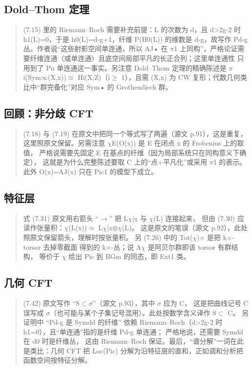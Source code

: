 \subsection*{Dold--Thom 定理}
\begin{quote}\small
(7.15) 里的 Riemann--Roch 需要补充前提：L 的次数为 d，且 d>2g-2 时 h1(L)=0，于是 h0(L)=d-g+1，纤维 P(H0(L)) 的维数是 d-g，故写作 Pd-g 丛。作者说“这些射影空间单连通，所以 AJ• 在 $\pi$1 上同构”，严格论证需要纤维连通（或单连通）且底空间局部平凡的长正合列；这里单连通性 只用到了 Pn 单连通这一事实。另注意 Dold--Thom 定理的精确陈述是 $\pi$i(Sym$\infty$(X,x))$\cong$ Hi(X;Z)（i$\ge$ 1），且需 (X,x) 为 CW 复形；代数几何类比中“群完备化”对应 Sym• 的 Grothendieck 群。
\end{quote}

\subsection*{回顾：非分歧 CFT}
\begin{quote}\small
(7.18) 与 (7.19) 在原文中把同一个等式写了两遍（源文 p.91），这是重复， 这里照原文保留。另需注意 $\chi$E(O(x)) 是 E 在闭点 x 的 Frobenius 上的取值， 严格说需要先固定 E 在基点的纤维（因为局部系统只在同构意义下确定）， 这就是为什么完整陈述要取 C 上的“点+平凡化”或采用 $\pi$1 的表示。 此外 O(x)=AJ(x) 只在 Pic1 的模型下成立。
\end{quote}

\subsection*{特征层}
\begin{quote}\small
式 (7.31) 原文用右箭头 “$\to$” 把 L$\chi$|x 与 $\chi$(L) 连接起来， 但由 (7.30) 应读作张量积：$\chi$(L(x))$\simeq$ L$\chi$|x$\otimes$$\chi$(L)。 这是原文的笔误（源文 p.92），此处照原文保留箭头，理解时按张量积。 另 (7.26) 中的 Tot($\chi$)$\times$ 是把 k$\times$-torsor 去掉零截面 得到的 k$\times$-丛；说 A$\chi$ 是阿贝尔群即该 torsor 有群结构， 等价于 $\chi$ 给出 Pic 到 BGm 的同态，即 Ext1 类。
\end{quote}

\subsection*{几何 CFT}
\begin{quote}\small
(7.42) 原文写作 “S$\subset$$\sigma$”（源文 p.93），其中 $\sigma$ 应为 C， 这是把曲线记号 C 误写成 $\sigma$（也可能与某个子集记号混用）。此处按数学含义译作 S$\subset$ C。 另证明中 “Pd-g 是 Symdd 的纤维” 依赖 Riemann--Roch（d>2g-2 时 h1=0），且“单连通”指的是纤维 Pd-g 单连通； 严格地说，还需要 Symdd 在 d0 时是纤维丛， 这由 Riemann--Roch 保证。最后，“谱分解”一词在此是类比：几何 CFT 把 Loc(Pic) 分解为沿特征层的直和，正如调和分析把函数空间按特征分解。
\end{quote}

